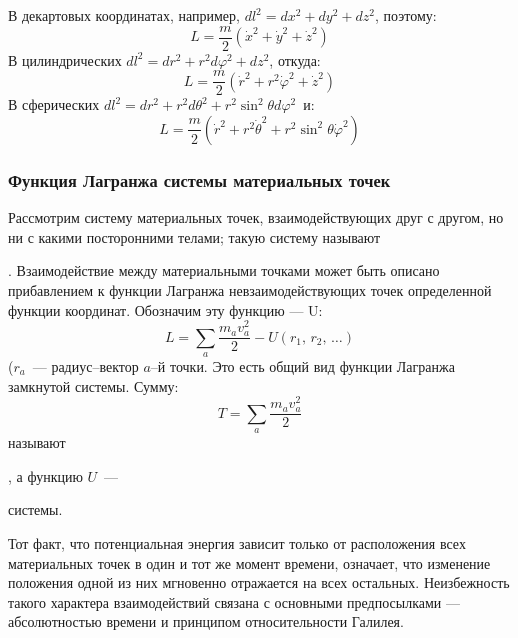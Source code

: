 \noindent
В декартовых координатах, например, $dl^2=dx^2+dy^2+dz^2$, поэтому:
\begin{equation}\label{mech15}
L = \frac{m}{2}\left(\dot{x}^2 + \dot{y}^2 + \dot{z}^2\right)
\end{equation}
В цилиндрических $dl^2=dr^2+r^2d\varphi^2+dz^2$, откуда:
\begin{equation}\label{mech16}
L = \frac{m}{2}\left(\dot{r}^2 + r^2\dot{\varphi}^2 + \dot{z}^2\right)
\end{equation}
В сферических $dl^2=dr^2+r^2d\theta^2+r^2\sin^2\theta d\varphi^2$\, и:
\begin{equation}\label{mech17}
L = \frac{m}{2}\left( \dot{r}^2 + r^2\dot{\theta}^2 +
r^2\sin^2\theta\dot{\varphi}^2\right)
\end{equation}

\subsubsection{Функция Лагранжа системы материальных точек}
Рассмотрим систему материальных точек, взаимодействующих друг с другом, но
ни с какими посторонними телами; такую систему называют
\parbox{59.7pt}{}.
Взаимодействие между материальными точками
может быть описано прибавлением к функции Лагранжа
невзаимодействующих точек  определенной
функции координат. Обозначим эту функцию --- U:
\begin{equation}\label{mech18}
L = \sum_a \frac{m_av^2_a}{2} - U (r_1,\, r_2,\, \dotsc)
\end{equation}
($r_a$\, --- радиус--вектор $a$--й точки. Это есть общий вид функции
Лагранжа замкнутой системы. Сумму:
$$
T = \sum_a\frac{m_{a}v^2_a}{2}
$$
называют \parbox{120.7pt}{}, а функцию
$U$\, ---
\parbox{127.7 pt}{} системы.


Тот факт, что потенциальная энергия зависит только от расположения всех
материальных точек в один и тот же момент времени, означает, что  изменение
положения одной из них мгновенно отражается на всех остальных. Неизбежность
такого характера взаимодействий связана с основными предпосылками ---
абсолютностью времени и принципом относительности Галилея.


